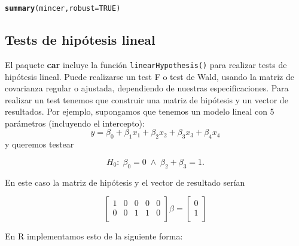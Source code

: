 \documentclass{article}\usepackage[]{graphicx}\usepackage[]{color}
\makeatletter
\newcommand{\hlnum}[1]{\textcolor[rgb]{0.686,0.059,0.569}{#1}}%
\newcommand{\hlstd}[1]{\textcolor[rgb]{0.345,0.345,0.345}{#1}}%
\newcommand{\hlkwc}[1]{\textcolor[rgb]{0.333,0.667,0.333}{#1}}%
\newcommand{\hlkwd}[1]{\textcolor[rgb]{0.737,0.353,0.396}{\textbf{#1}}}%
\newenvironment{kframe}{%
 \def\at@end@of@kframe{}%
 \ifinner\ifhmode%
  \def\at@end@of@kframe{\end{minipage}}%
  \begin{minipage}{\columnwidth}%
 \fi\fi%
 \def\FrameCommand##1{\hskip\@totalleftmargin \hskip-\fboxsep
 \colorbox{shadecolor}{##1}\hskip-\fboxsep
     \hskip-\linewidth \hskip-\@totalleftmargin \hskip\columnwidth}%
 \MakeFramed {\advance\hsize-\width
   \@totalleftmargin\z@ \linewidth\hsize
   \@setminipage}}%
 {\par\unskip\endMakeFramed%
 \at@end@of@kframe}
\newenvironment{knitrout}{}{} %
\newcommand*{\paq}[1]{\textbf{#1}}
\makeatother
\begin{document}
\begin{knitrout}
\color{fgcolor}\begin{kframe}
\begin{alltt}
\hlkwd{summary}\hlstd{(mincer,} \hlkwc{robust} \hlstd{=} \hlnum{TRUE}\hlstd{)}
\end{alltt}
\end{kframe}
\end{knitrout}


\subsection{Tests de hipótesis lineal}

El paquete \paq{car} incluye la función \verb|linearHypothesis()| para realizar tests de hipótesis lineal. Puede realizarse un test F o test de Wald, usando la matriz de covarianza regular o ajustada, dependiendo de nuestras especificaciones. Para realizar un test tenemos que construir una matriz de hipótesis y un vector de resultados. Por ejemplo, supongamos que tenemos un modelo lineal con 5 parámetros (incluyendo el intercepto):
\begin{equation*}
y = \beta_0 + \beta_1 x_1 + \beta_2 x_2 + \beta_3 x_3 + \beta_4 x_4
\end{equation*}
y queremos testear

\begin{equation*}
H_0 : \; \beta_0 = 0 \; \wedge \; \beta_2 + \beta_3 = 1.
\end{equation*}

En este caso la matriz de hipótesis y el vector de resultado serían

\begin{equation*}
\begin{bmatrix}
    1 & 0 & 0 & 0 & 0 \\
    0 & 0 & 1 & 1 & 0 \\
\end{bmatrix}
\beta = 
\begin{bmatrix}
    0 \\
    1 \\
\end{bmatrix}
\end{equation*}

En R implementamos esto de la siguiente forma:
\end{document}
